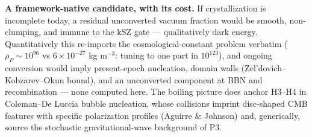 \documentclass[
]{article}
\begin{document}
\textbf{A framework-native candidate, with its cost.} If crystallization
is incomplete today, a residual unconverted vacuum fraction would be
smooth, non-clumping, and immune to the kSZ gate --- qualitatively dark
energy. Quantitatively this re-imports the cosmological-constant problem
verbatim (\(\rho_P \sim 10^{96}\) vs \(6\times10^{-27}\) kg m\(^{-3}\):
tuning to one part in \(10^{123}\)), and ongoing conversion would imply
present-epoch nucleation, domain walls (Zel'dovich--Kobzarev--Okun
bound), and an unconverted component at BBN and recombination --- none
computed here. The boiling picture does anchor H3--H4 in Coleman--De
Luccia bubble nucleation, whose collisions imprint disc-shaped CMB
features with specific polarization profiles (Aguirre \& Johnson) and,
generically, source the stochastic gravitational-wave background of P3.
\end{document}
